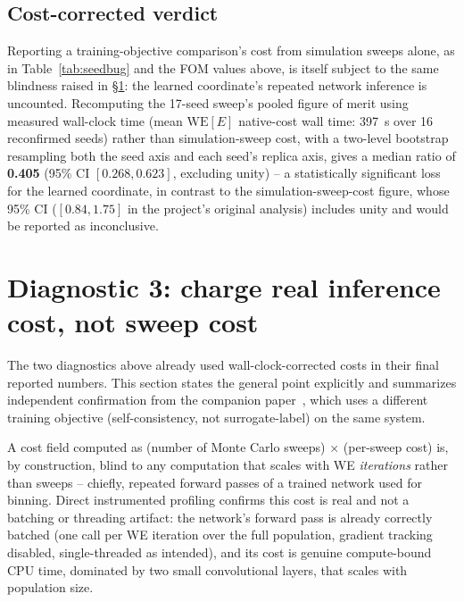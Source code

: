 \documentclass[a4paper,fleqn]{cas-sc}
\newcommand{\WE}{\mathrm{WE}}
\begin{document}
\subsection{Cost-corrected verdict}

Reporting a training-objective comparison's cost from simulation sweeps
alone, as in Table~\ref{tab:seedbug} and the FOM values above, is itself
subject to the same blindness raised in \S\ref{sec:diag3}: the learned
coordinate's repeated network inference is uncounted. Recomputing the
17-seed sweep's pooled figure of merit using measured wall-clock time
(mean $\WE[E]$ native-cost wall time: 397~s over 16 reconfirmed seeds)
rather than simulation-sweep cost, with a two-level bootstrap resampling
both the seed axis and each seed's replica axis, gives a median ratio of
\textbf{0.405} (95\% CI $[0.268, 0.623]$, excluding unity) -- a
statistically significant loss for the learned coordinate, in contrast to
the simulation-sweep-cost figure, whose 95\% CI ($[0.84, 1.75]$ in the
project's original analysis) includes unity and would be reported as
inconclusive.

\section{Diagnostic 3: charge real inference cost, not sweep cost}\label{sec:diag3}

The two diagnostics above already used wall-clock-corrected costs in their
final reported numbers. This section states the general point explicitly
and summarizes independent confirmation from the companion
paper~\citep{alzaatreh2026}, which uses a different training objective
(self-consistency, not surrogate-label) on the same system.

A cost field computed as (number of Monte Carlo sweeps) $\times$ (per-sweep
cost) is, by construction, blind to any computation that scales with WE
\emph{iterations} rather than sweeps -- chiefly, repeated forward passes of
a trained network used for binning. Direct instrumented profiling confirms
this cost is real and not a batching or threading artifact: the network's
forward pass is already correctly batched (one call per WE iteration over
the full population, gradient tracking disabled, single-threaded as
intended), and its cost is genuine compute-bound CPU time, dominated by two
small convolutional layers, that scales with population size.
\end{document}
